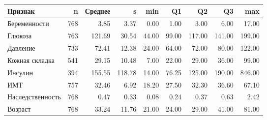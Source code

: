 \begin{tabular}{lrrrrrrrr}
\toprule
Признак & n & Среднее & s & min & Q1 & Q2 & Q3 & max \\
\midrule
Беременности & 768 & 3.85 & 3.37 & 0.00 & 1.00 & 3.00 & 6.00 & 17.00 \\
Глюкоза & 763 & 121.69 & 30.54 & 44.00 & 99.00 & 117.00 & 141.00 & 199.00 \\
Давление & 733 & 72.41 & 12.38 & 24.00 & 64.00 & 72.00 & 80.00 & 122.00 \\
Кожная складка & 541 & 29.15 & 10.48 & 7.00 & 22.00 & 29.00 & 36.00 & 99.00 \\
Инсулин & 394 & 155.55 & 118.78 & 14.00 & 76.25 & 125.00 & 190.00 & 846.00 \\
ИМТ & 757 & 32.46 & 6.92 & 18.20 & 27.50 & 32.30 & 36.60 & 67.10 \\
Наследственность & 768 & 0.47 & 0.33 & 0.08 & 0.24 & 0.37 & 0.63 & 2.42 \\
Возраст & 768 & 33.24 & 11.76 & 21.00 & 24.00 & 29.00 & 41.00 & 81.00 \\
\bottomrule
\end{tabular}
